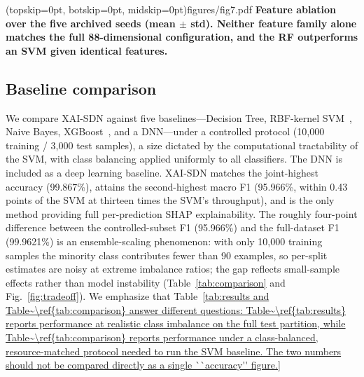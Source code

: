 \documentclass{ieeeaccess}
\begin{document}
\Figure[t!](topskip=0pt, botskip=0pt, midskip=0pt){figures/fig7.pdf}
{ \textbf{Feature ablation over the five archived seeds (mean $\pm$ std). Neither feature family alone matches the full 88-dimensional configuration, and the RF outperforms an SVM given identical features.}\label{fig:ablation}}

\subsection{Baseline comparison}
We compare XAI-SDN against five baselines---Decision Tree, RBF-kernel SVM~\cite{cortes1995svm}, Naive Bayes, XGBoost~\cite{chen2016xgboost}, and a DNN---under a controlled protocol (10,000 training / 3,000 test samples), a size dictated by the computational tractability of the SVM, with class balancing applied uniformly to all classifiers. The DNN is included as a deep learning baseline. XAI-SDN matches the joint-highest accuracy (99.867\%), attains the second-highest macro F1 (95.966\%, within 0.43 points of the SVM at thirteen times the SVM's throughput), and is the only method providing full per-prediction SHAP explainability. The roughly four-point difference between the controlled-subset F1 (95.966\%) and the full-dataset F1 (99.9621\%) is an ensemble-scaling phenomenon: with only 10,000 training samples the minority class contributes fewer than 90 examples, so per-split estimates are noisy at extreme imbalance ratios; the gap reflects small-sample effects rather than model instability (Table~\ref{tab:comparison} and Fig.~\ref{fig:tradeoff}). We emphasize that Table~\ref{tab:results and Table~\ref{tab:comparison} answer different questions: Table~\ref{tab:results} reports performance at realistic class imbalance on the full test partition, while Table~\ref{tab:comparison} reports performance under a class-balanced, resource-matched protocol needed to run the SVM baseline. The two numbers should not be compared directly as a single ``accuracy'' figure.}
\end{document}
